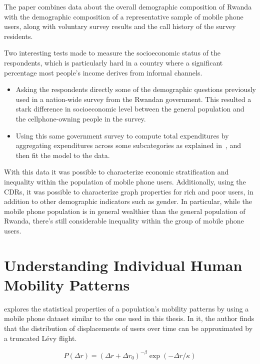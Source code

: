 The paper combines data about the overall demographic composition of Rwanda with the demographic composition of a representative sample of mobile phone users, along with voluntary survey results and the call history of the survey residents.

Two interesting tests made to measure the socioeconomic status of the respondents, which is particularly hard in a country where a significant percentage most people's income derives from informal channels.

\begin{itemize}
	\item Asking the respondents directly some of the demographic questions previously used in a nation-wide survey from the Rwandan government. This resulted a stark difference in socioeconomic level between the general population and the cellphone-owning people in the survey.
	\item Using this same government survey to compute total expenditures by aggregating expenditures across some subcategories as explained in~\cite{deaton2002}, and then fit the model to the data.
\end{itemize}

With this data it was possible to characterize economic stratification and inequality within the population of mobile phone users. Additionally, using the CDRs, it was possible to characterize graph properties for rich and poor users, in addition to other demographic indicators such as gender. In particular, while the mobile phone population is in general wealthier than the general population of Rwanda, there's still considerable inequality within the group of mobile phone users.

\section{Understanding Individual Human Mobility Patterns}

\cite{gonzalez2008understanding} explores the statistical properties of a population's mobility patterns by using a mobile phone dataset similar to the one used in this thesis. In it, the author finds that the distribution of displacements of users over time can be approximated by a truncated Lévy flight\cite{mandelbrot1982fractal}.

\begin{equation}
	P \left( \Delta r \right) = \left( \Delta r + \Delta r_0 \right) ^{-\beta} \exp \left( -\Delta r / \kappa \right)
\end{equation}

